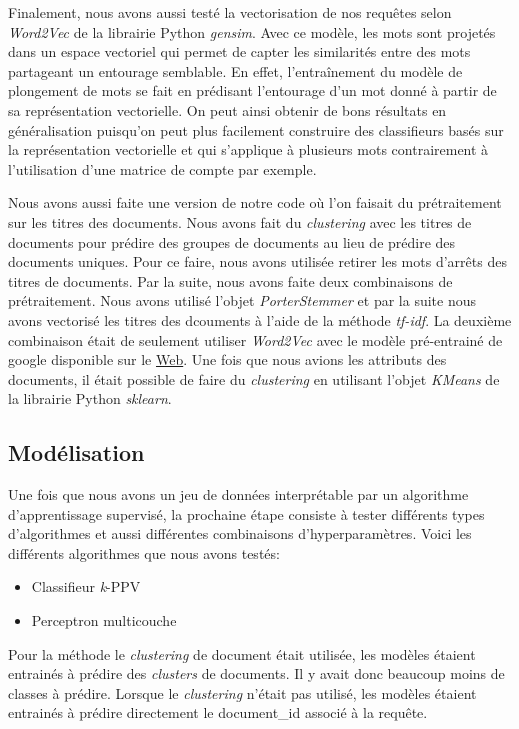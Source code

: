 Finalement, nous avons aussi testé la vectorisation de nos requêtes selon \textit{Word2Vec} de la librairie Python \textit{gensim}.
Avec ce modèle, les mots sont projetés dans un espace vectoriel qui permet de capter les similarités entre des mots partageant un entourage semblable. En effet, l'entraînement du modèle de plongement de mots se fait en prédisant l'entourage d'un mot donné à partir de sa représentation vectorielle. On peut ainsi obtenir de bons résultats en généralisation puisqu'on peut plus facilement construire des classifieurs basés sur la représentation vectorielle et qui s'applique à plusieurs mots contrairement à l'utilisation d'une matrice de compte par exemple.

Nous avons aussi faite une version de notre code où l'on faisait du prétraitement sur les titres des documents. Nous avons fait du \textit{clustering} avec les titres de documents pour prédire des groupes de documents au lieu de prédire des documents uniques. Pour ce faire, nous avons utilisée retirer les mots d'arrêts des titres de documents. Par la suite, nous avons faite deux combinaisons de prétraitement. Nous avons utilisé l'objet \textit{PorterStemmer} et par la suite nous avons vectorisé les titres des dcouments à l'aide de la méthode \textit{tf-idf}. La deuxième combinaison était de seulement utiliser \textit{Word2Vec} avec le modèle pré-entrainé de google disponible sur le \href{https://code.google.com/archive/p/word2vec/}{Web}. Une fois que nous avions les attributs des documents, il était possible de faire du \textit{clustering} en utilisant l'objet \textit{KMeans} de la librairie Python \textit{sklearn}. 

\subsection{Modélisation}

Une fois que nous avons un jeu de données interprétable par un algorithme d'apprentissage supervisé, la prochaine étape consiste à tester différents types d'algorithmes et aussi différentes combinaisons d'hyperparamètres. Voici les différents algorithmes que nous avons testés:

\begin{itemize}
  \item Classifieur \textit{k}-PPV
  \item Perceptron multicouche
\end{itemize}

Pour la méthode le \textit{clustering} de document était utilisée, les modèles étaient entrainés à prédire des \textit{clusters} de documents. Il y avait donc beaucoup moins de classes à prédire. Lorsque le \textit{clustering} n'était pas utilisé, les modèles étaient entrainés à prédire directement le document_id associé à la requête. 

